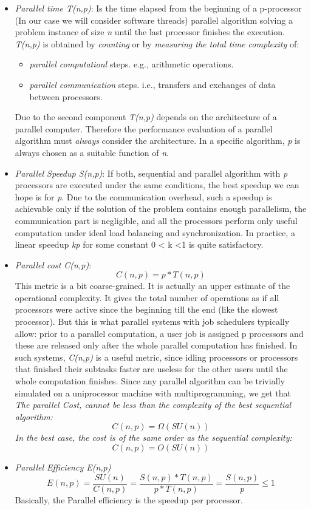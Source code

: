 \begin{itemize}
	\item \emph{Parallel time T(n,p)}: Is the time elapsed from the beginning of a p-processor (In our case we will consider software threads) parallel algorithm solving a problem instance of size \emph{n} until the last processor finishes the execution. \emph{T(n,p)} is obtained by \emph{counting} or by \emph{measuring the total time complexity} of:
	\begin{itemize}
		\item \emph{parallel computationl} steps. e.g., arithmetic operations.
		\item \emph{parallel communication} steps. i.e., transfers and exchanges of data between processors.
	\end{itemize}	
	Due to the second component \emph{T(n,p)} depends on the architecture of a parallel computer. Therefore the performance evaluation of a parallel algorithm must \emph{always} consider the architecture. In a specific algorithm, \emph{p} is always chosen as a suitable function of \emph{n}.

	\item \emph{Parallel Speedup S(n,p)}: If both, sequential and parallel algorithm with \emph{p} processors are executed under the same conditions, the best speedup we can hope is for \emph{p}. Due to the communication overhead, such a speedup is achievable only if the solution of the problem contains enough parallelism, the communication part is negligible, and all the processors perform only useful computation under ideal load balancing and synchronization. In practice, a linear speedup \emph{kp} for some constant 0 < k <1 is quite satisfactory.
	
	\item \emph{Parallel cost C(n,p)}: 
	\[C(n,p) = p * T(n,p) \] 
	This metric is a bit coarse-grained. It is actually an upper estimate of the operational complexity. It gives the total number of operations as if all processors were active since the beginning till the end (like the slowest processor). But this is what parallel systems with job schedulers typically allow: prior to a parallel computation, a user job is assigned p processors and these are released only after the whole parallel computation has finished. In such systems, \emph{C(n,p)} is a useful metric, since idling processors or processors that finished their subtasks faster are useless for the other users until the whole computation finishes. Since any parallel algorithm can be trivially simulated on a uniprocessor machine with multiprogramming, we get that \emph{The parallel Cost, cannot be less than the complexity of the best sequential algorithm:}
	\[C(n,p) = \Omega(SU(n)) \] 
	\emph{In the best case, the cost is of the same order as the sequential complexity:}
	\[C(n,p) = O(SU(n)) \] 
	
	\item \emph{Parallel Efficiency E(n,p)}
	\[E(n,p) = \frac{SU(n)}{C(n,p)} = \frac{S(n,p) * T(n,p)}{p * T(n,p)} =  \frac{S(n,p)}{p} \leq 1 \] 
	Basically, the Parallel efficiency is the speedup per processor.
\end{itemize}

